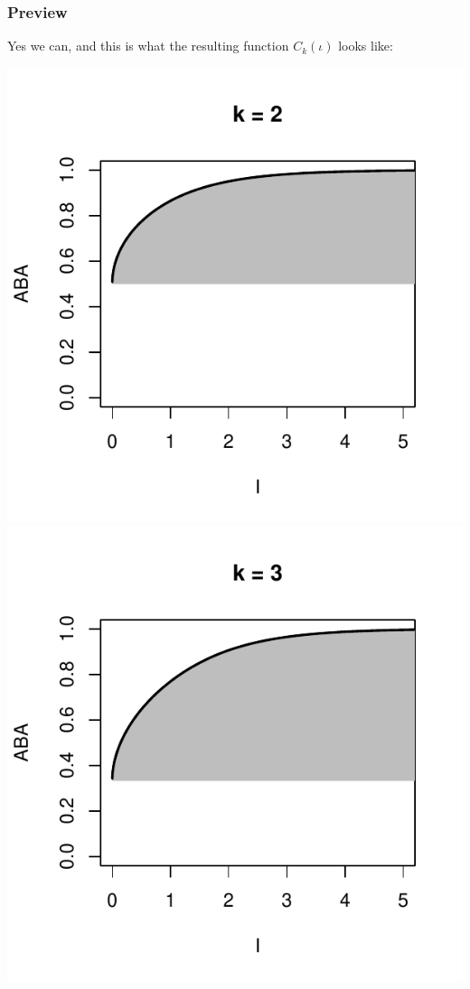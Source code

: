 \documentclass{beamer}
\begin{document}
\begin{frame}
\frametitle{Preview}

Yes we can, and this is what the resulting function $C_k(\iota)$ looks like:
\begin{center}
\includegraphics[scale = 0.34]{ck_2.pdf}
\includegraphics[scale = 0.34]{ck_3.pdf}

\end{center}
\end{frame}
\end{document}
